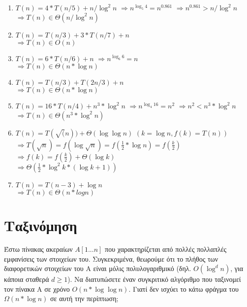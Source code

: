 \begin{enumerate}
\begin{enumerate}
            \item $T(n) = 4*T(n/5)+n/\log^2{n}$
                $\Rightarrow n^{\log_5 {4}} = n^{0.861}$
                $\Rightarrow n^{0.861} > n/\log^2{n}$\\
                $\Rightarrow T(n) \in \Theta(n/\log^2{n})$

            \item $T(n) = T(n/3) +3*T(n/7)+n$\\
                $\Rightarrow T(n) \in O(n)$

            \item $T(n) = 6*T(n/6)+n$
                $\Rightarrow n^{\log _6 {6}} = n$\\
                $\Rightarrow T(n) \in \Theta(n*\log {n})$

            \item $T(n) = T(n/3) + T(2n/3) + n$\\
                $\Rightarrow T(n) \in \Theta(n*\log{n})$

            \item $T(n) = 16*T(n/4) + n^3*\log^2{n}$
                $\Rightarrow n^{\log _4{16}} = n^2$
                $\Rightarrow n^2 < n^3*\log^2{n}$\\
                $\Rightarrow T(n) \in \Theta(n^3*\log^2{n})$

            \item $T(n) = T(\sqrt(n)) + \Theta(\log{\log{n}})$
                $(k=\log{n},f(k)=T(n))$\\
                $\Rightarrow
                T(\sqrt{n})=f(\log{\sqrt{n}})=f(\frac{1}{2}*\log{n})=f(\frac{k}{2}) $\\
                $\Rightarrow f(k)=f(\frac{k}{2})+\Theta(\log{k})$\\
                $\Rightarrow \Theta(\frac{1}{2}*\log^2{k}*(\log{k}+1))$

            \item $T(n) = T(n-3) + \log{n}$\\
                $\Rightarrow T(n) \in \Theta(n*logn)$

        \end{enumerate}
\end{enumerate}

\pagebreak
\section{Ταξινόμηση}
\begin{textit} 
    Έστω πίνακας ακεραίων $A[1...n]$ που χαρακτηρίζεται από πολλές πολλαπλές
    εμφανίσεις των στοιχείων του. Συγκεκριμένα, θεωρούμε ότι το πλήθος των
    διαφορετικών στοιχείων του Α είναι μόλις πολυλογαριθμικό (δηλ.
    $O(\log^d{n})$, για κάποια σταθερά $d \geq 1$). Να διατυπώσετε έναν
    συγκριτικό αλγόριθμο που ταξινομεί τον πίνακα Α σε χρόνο
    $O(n*\log{\log{n}})$. Γιατί δεν ισχύει το κάτω φράγμα του
    $\Omega({n*\log{n}})$ σε αυτή την περίπτωση; 
\end{textit}
\vspace{0.4cm}

